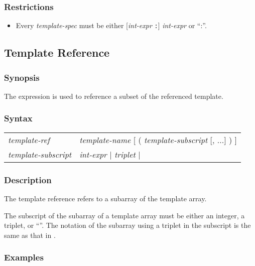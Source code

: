 \subsubsection*{Restrictions}

\begin{itemize}
\item Every {\it template-spec} must be either [{\it int-expr} {\tt :}] {\it
  int-expr} or ``:''.
\end{itemize}

\subsection{Template Reference}

\subsubsection*{Synopsis}

The  expression is used to reference a subset of
the referenced template.

\subsubsection*{Syntax}

\begin{center}
\begin{tabular}{ll}
{\it template-ref} & {\it template-name} [ ( {\it template-subscript}
[,  ...] ) ] \\
{\it template-subscript} & {\it int-expr} $\vert$ {\it triplet} $\vert$
     {\tt *} \\
\end{tabular}
\end{center}

\subsubsection*{Description}

The template reference refers to a subarray of the template array.  

The subscript
of the subarray of a template array must be either an integer, a
triplet, or ``{\tt *}''. The notation of the subarray using a triplet in
the subscript is the same as that in \Fort. 

\subsubsection*{Examples}

